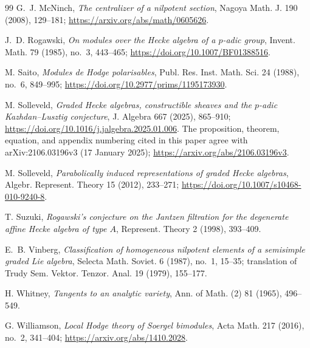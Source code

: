\documentclass[11pt]{amsart}
\theoremstyle{definition}
\theoremstyle{remark}
\begin{document}
\begin{thebibliography}{99}
G.~J. McNinch, \emph{The centralizer of a nilpotent section},
Nagoya Math. J. 190 (2008), 129--181;
\url{https://arxiv.org/abs/math/0605626}.

J.~D. Rogawski, \emph{On modules over the Hecke algebra of a $p$-adic group},
Invent. Math. 79 (1985), no.~3, 443--465;
\url{https://doi.org/10.1007/BF01388516}.

M. Saito, \emph{Modules de Hodge polarisables},
Publ. Res. Inst. Math. Sci. 24 (1988), no.~6, 849--995;
\url{https://doi.org/10.2977/prims/1195173930}.

M. Solleveld, \emph{Graded Hecke algebras, constructible sheaves and the
$p$-adic Kazhdan--Lusztig conjecture},
J. Algebra 667 (2025), 865--910;
\url{https://doi.org/10.1016/j.jalgebra.2025.01.006}.
The proposition, theorem, equation, and appendix numbering cited in this
paper agree with arXiv:2106.03196v3 (17 January 2025);
\url{https://arxiv.org/abs/2106.03196v3}.

M. Solleveld, \emph{Parabolically induced representations of graded Hecke
algebras}, Algebr. Represent. Theory 15 (2012), 233--271;
\url{https://doi.org/10.1007/s10468-010-9240-8}.

T. Suzuki, \emph{Rogawski's conjecture on the Jantzen filtration for the
degenerate affine Hecke algebra of type $A$}, Represent. Theory 2 (1998),
393--409.

E.~B. Vinberg, \emph{Classification of homogeneous nilpotent elements of a
semisimple graded Lie algebra}, Selecta Math. Soviet. 6 (1987), no.~1,
15--35; translation of Trudy Sem. Vektor. Tenzor. Anal. 19 (1979),
155--177.

H. Whitney, \emph{Tangents to an analytic variety},
Ann. of Math. (2) 81 (1965), 496--549.

G. Williamson, \emph{Local Hodge theory of Soergel bimodules},
Acta Math. 217 (2016), no.~2, 341--404;
\url{https://arxiv.org/abs/1410.2028}.

\end{thebibliography}
\end{document}
